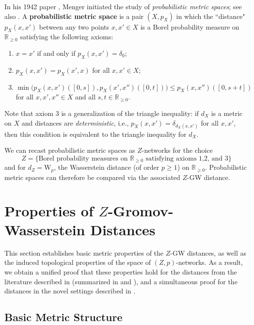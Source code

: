 \documentclass[twoside,11pt]{article}
\theoremstyle{definition}
\newcommand{\R}{\mathbb{R}}
\newcommand{\define}[1]{\textbf{#1}}
\begin{document}
 In his 1942 paper \citep{menger1942statistical}, Menger initiated the study of \emph{probabilistic metric spaces}; see also \citep{wald1943statistical,kramosil1975fuzzy,schweizer1960statistical}. A
\define{probabilistic metric space} is a pair $(X,p_X)$ in which the ``distance" $p_X(x,x')$
between any two points $x,x'\in X$ is a Borel probability measure  on $\R_{\geq 0}$ satisfying the following axioms:
\begin{enumerate}
\item $x=x'$ if and only if  $p_X(x,x')=\delta_0$;
\item $p_X(x,x') = p_X(x',x)$ for all $x,x'\in X$;
\item $\min\big(p_X(x,x')([0,s]),p_X(x',x
'')([0,t])\big) \leq p_X(x,x'')([0,s+t])$ for all $x,x',x''\in X$ and all $s,t\in\R_{\geq 0}$.
\end{enumerate}

Note that axiom 3 is a generalization of the triangle inequality: if $d_X$ is a metric on $X$ and distances are \emph{deterministic}, i.e., $p_X(x,x') = \delta_{d_X(x,x')}$ for all $x,x'$, then this condition is equivalent to the triangle inequality for $d_X$.

\medskip

We can recast probabilistic metric spaces as $Z$-networks for the choice 
\[
Z = \{\text{Borel probability measures on $\R_{\geq 0}$ satisfying axioms 1,2, and 3}\}
\]
and for $d_Z = \mathrm{W}_p$, the Wasserstein distance (of order $p\geq 1$) on $\R_{\geq 0}$. Probabilistic metric spaces can therefore be compared via the associated $Z$-GW distance.



\section{Properties of \texorpdfstring{$Z$}{Z}-Gromov-Wasserstein Distances}
\label{sec: metric_properties}

This section establishes basic metric properties of the $Z$-GW distances, as well as the induced topological properties of the space of $(Z,p)$-networks. As a result, we obtain a unified proof that these properties hold for the distances from the literature described in  (summarized in  and ), and a simultaneous proof for the distances in the novel settings described in .

\subsection{Basic Metric Structure}
\end{document}
